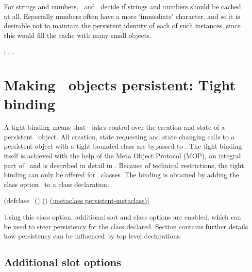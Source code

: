 For strings and numbers, \ and
\ decide if strings and numbers should be
cached at all. Especially numbers often have a more `immediate'
character, and so it is desirable not to maintain the persistent
identity of each of such instances, since this would fill the cache
with many small objects.

 {};
, .

\section[Tight binding]%
{Making \protect\clos\ objects persistent: Tight binding}%
\label{sec:TightBinding}

A tight binding means that \plob\ takes control over
the creation and state of a persistent \clos\ object. All creation,
state requesting and state changing calls to a persistent object with
a tight bounded class are bypassed to \plobwoexcl. The tight binding
itself is achieved with the help of the Meta Object Protocol (MOP), an
integral part of \clos\ and is described in detail in \cite{bib:AMOP}.
Because of technical restrictions, the tight binding can only be
offered for \clos\ classes. The binding is obtained by adding the
class option
\hspace{\lispblank}\ to a
class declaration:
\begin{IndentedCompactCode}
(defclass \ ()
  (\comment{\,\{\,\lt{}slots\gt\,\}\,})
  \underline{(:metaclass persistent-metaclass)})
\end{IndentedCompactCode}

Using this class option, additional slot and class options are
enabled, which can be used to steer persistency for the class
declared. Section  contains further
details how persistency can be influenced by top level declarations.

\subsection{Additional slot options}%
\label{sec:AdditionalSlotOptions}

